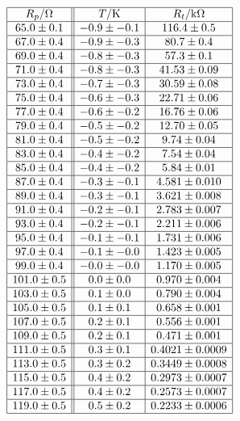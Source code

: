 \documentclass[a4paper,12pt]{article}
\begin{document}
\begin{table}
$$
\begin{array}{|c||c|c|}
\hline
R_p/\Omega& T/\mbox{K}& R_t/\mbox{k}\Omega\\ \hline
65.0\pm 0.1&-0.9\pm-0.1&116.4\pm 0.5\\ \hline
67.0\pm 0.4&-0.9\pm-0.3&80.7\pm 0.4\\ \hline
69.0\pm 0.4&-0.8\pm-0.3&57.3\pm 0.1\\ \hline
71.0\pm 0.4&-0.8\pm-0.3&41.53\pm 0.09\\ \hline
73.0\pm 0.4&-0.7\pm-0.3&30.59\pm 0.08\\ \hline
75.0\pm 0.4&-0.6\pm-0.3&22.71\pm 0.06\\ \hline
77.0\pm 0.4&-0.6\pm-0.2&16.76\pm 0.06\\ \hline
79.0\pm 0.4&-0.5\pm-0.2&12.70\pm 0.05\\ \hline
81.0\pm 0.4&-0.5\pm-0.2&9.74\pm 0.04\\ \hline
83.0\pm 0.4&-0.4\pm-0.2&7.54\pm 0.04\\ \hline
85.0\pm 0.4&-0.4\pm-0.2&5.84\pm 0.01\\ \hline
87.0\pm 0.4&-0.3\pm-0.1&4.581\pm 0.010\\ \hline
89.0\pm 0.4&-0.3\pm-0.1&3.621\pm 0.008\\ \hline
91.0\pm 0.4&-0.2\pm-0.1&2.783\pm 0.007\\ \hline
93.0\pm 0.4&-0.2\pm-0.1&2.211\pm 0.006\\ \hline
95.0\pm 0.4&-0.1\pm-0.1&1.731\pm 0.006\\ \hline
97.0\pm 0.4&-0.1\pm-0.0&1.423\pm 0.005\\ \hline
99.0\pm 0.4&-0.0\pm-0.0&1.170\pm 0.005\\ \hline
101.0\pm 0.5&0.0\pm0.0&0.970\pm 0.004\\ \hline
103.0\pm 0.5&0.1\pm0.0&0.790\pm 0.004\\ \hline
105.0\pm 0.5&0.1\pm0.1&0.658\pm 0.001\\ \hline
107.0\pm 0.5&0.2\pm0.1&0.556\pm 0.001\\ \hline
109.0\pm 0.5&0.2\pm0.1&0.471\pm 0.001\\ \hline
111.0\pm 0.5&0.3\pm0.1&0.4021\pm 0.0009\\ \hline
113.0\pm 0.5&0.3\pm0.2&0.3449\pm 0.0008\\ \hline
115.0\pm 0.5&0.4\pm0.2&0.2973\pm 0.0007\\ \hline
117.0\pm 0.5&0.4\pm0.2&0.2573\pm 0.0007\\ \hline
119.0\pm 0.5&0.5\pm0.2&0.2233\pm 0.0006\\ \hline

\end{array}$$
\end{table}
\end{document}

